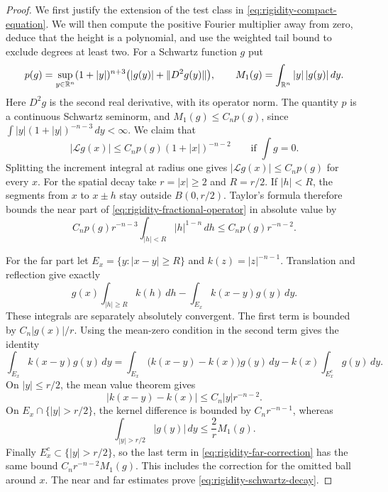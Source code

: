 \begin{proof}
We first justify the extension of the test class in
\eqref{eq:rigidity-compact-equation}. We will then compute the positive
Fourier multiplier away from zero, deduce that the height is a
polynomial, and use the weighted tail bound to exclude degrees at
least two. For a Schwartz function $g$ put
\[
 p(g)=\sup_{y\in\mathbb R^n}(1+|y|)^{n+3}
       \bigl(|g(y)|+\|D^2g(y)\|\bigr),
 \qquad
 M_1(g)=\int_{\mathbb R^n}|y|\,|g(y)|\,dy.
\]
Here $D^2g$ is the second real derivative, with its operator norm.
The quantity $p$ is a continuous Schwartz seminorm, and
$M_1(g)\le C_n p(g)$, since
$\int |y|(1+|y|)^{-n-3}\,dy<\infty$.
We claim that
\begin{equation}\label{eq:rigidity-schwartz-decay}
 |\mathcal Lg(x)|\le C_n p(g)(1+|x|)^{-n-2}
 \qquad\text{if }\int g=0.
\end{equation}
Splitting the increment integral at radius one gives
$|\mathcal Lg(x)|\le C_n p(g)$ for every $x$.
For the spatial decay take $r=|x|\ge2$ and $R=r/2$.
If $|h|<R$, the segments from $x$ to $x\pm h$ stay outside
$B(0,r/2)$.  Taylor's formula therefore bounds the near part of
\eqref{eq:rigidity-fractional-operator} in absolute value by
\[
 C_n p(g)r^{-n-3}
      \int_{|h|<R}|h|^{1-n}\,dh
 \le C_n p(g)r^{-n-2}.
\]

For the far part let $E_x=\{y:|x-y|\ge R\}$ and
$k(z)=|z|^{-n-1}$.  Translation and reflection give exactly
\[
 g(x)\int_{|h|\ge R}k(h)\,dh
       -\int_{E_x}k(x-y)g(y)\,dy.
\]
These integrals are separately absolutely convergent.  The first term is
bounded by $C_n|g(x)|/r$.  Using the mean-zero condition in the second
term gives the identity
\begin{equation}\label{eq:rigidity-far-correction}
 \int_{E_x}k(x-y)g(y)\,dy
 =\int_{E_x}\bigl(k(x-y)-k(x)\bigr)g(y)\,dy
       -k(x)\int_{E_x^c}g(y)\,dy.
\end{equation}
On $|y|\le r/2$, the mean value theorem gives
\[
 |k(x-y)-k(x)|\le C_n|y|r^{-n-2}.
\]
On $E_x\cap\{|y|>r/2\}$, the kernel difference is bounded by
$C_n r^{-n-1}$, whereas
\[
 \int_{|y|>r/2}|g(y)|\,dy\le\frac{2}{r}M_1(g).
\]
Finally $E_x^c\subset\{|y|>r/2\}$, so the last term in
\eqref{eq:rigidity-far-correction} has the same bound
$C_n r^{-n-2}M_1(g)$.  This includes the correction for the omitted ball
around $x$.  The near and far estimates prove
\eqref{eq:rigidity-schwartz-decay}.


\end{proof}

